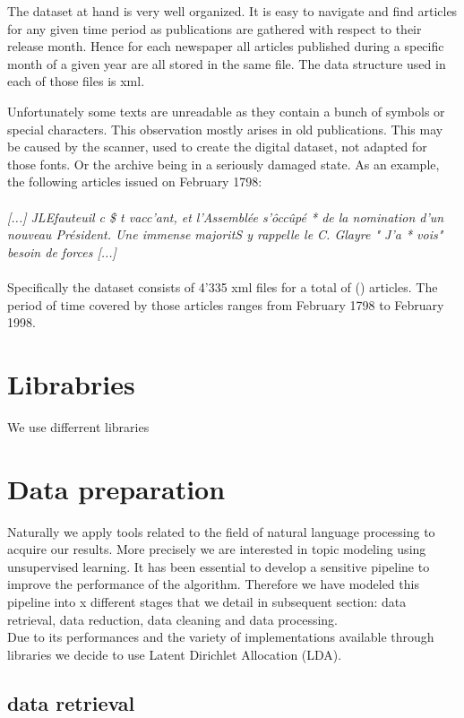 \documentclass[11pt]{article}
\begin{document}
The dataset at hand is very well organized. It is easy to navigate and find articles for any given time
period as publications are gathered with respect to their release month. Hence for each newspaper all articles published during a specific month of a given year are all stored in the same file. The data structure used in each of those files is xml.

Unfortunately some texts are unreadable as they contain a bunch of symbols or special characters. This observation mostly arises in old publications. This may be caused by the scanner, used to create the digital dataset, not adapted for those fonts. Or the archive being in a seriously damaged state. As an example, the following articles issued on February 1798:\\
\\
\textit{[...] JLEfauteuil c \$ t vacc'ant, et l'Assemblée s'ôccûpé * de la nomination d'un nouveau Président. Une immense majoritS y rappelle le C. Glayre " J'a * vois" besoin de forces [...]}\\
\\
Specifically the dataset consists of 4'335 xml files for a total of () articles. The period of time covered by those articles ranges from February 1798 to February 1998.

\section{Librabries}

We use differrent libraries
\section{Data preparation}

Naturally we apply tools related to the field of natural language processing to acquire our results. More
precisely we are interested in topic modeling using unsupervised learning. It has been essential to develop
a sensitive pipeline to improve the performance of the algorithm. Therefore we have modeled this pipeline into x different stages that we detail in subsequent section: data retrieval, data reduction, data cleaning and data processing.
\\
Due to its performances and the variety of implementations available through libraries we decide to use Latent Dirichlet Allocation (LDA). 
\subsection{data retrieval}
\end{document}
